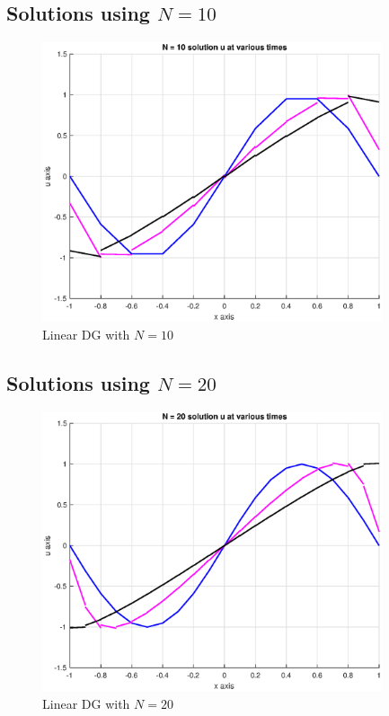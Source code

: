 \documentclass[12pt]{article} %
\newcommand{\1}[1]{\mathds{1}\left[#1\right]}
\begin{document}
\subsection{Solutions using $N=10$}
\newpage
\begin{figure}[t]
\includegraphics[width=10cm]{overlayn10.eps}
\centering
\caption{Linear DG with $N=10$}
\end{figure}
\newpage

\subsection{Solutions using $N=20$}
\newpage
\begin{figure}[t]
\includegraphics[width=10cm]{overlayn20.eps}
\centering
\caption{Linear DG with $N=20$}
\end{figure}
\newpage
\end{document}
